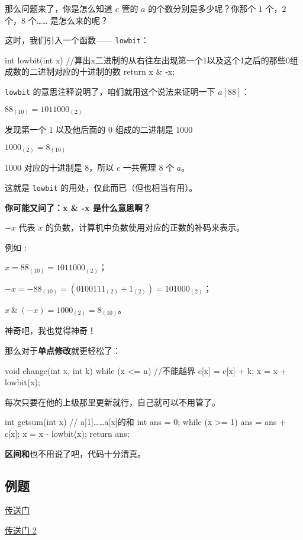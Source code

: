 那么问题来了，你是怎么知道 $c$ 管的 $a$ 的个数分别是多少呢？你那个 $1$ 个，$2$ 个，$8$ 个…… 是怎么来的呢？

这时，我们引入一个函数—— \texttt{lowbit}：

\begin{cppcode}
int lowbit(int x) {
  //算出x二进制的从右往左出现第一个1以及这个1之后的那些0组成数的二进制对应的十进制的数
  return x & -x;
}
\end{cppcode}

\texttt{lowbit} 的意思注释说明了，咱们就用这个说法来证明一下 $a[88]$：

$88_{(10)}=1011000_{(2)}$

发现第一个 $1$ 以及他后面的 $0$ 组成的二进制是 $1000$

$1000_{(2)} = 8_{(10)}$

$1000$ 对应的十进制是 $8$，所以 $c$ 一共管理 $8$ 个 $a$。

这就是 \texttt{lowbit} 的用处，仅此而已（但也相当有用）。

\textbf{你可能又问了：x \& -x 是什么意思啊？}

\begin{QUOTE}{}{}
$-x$ 代表 $x$ 的负数，计算机中负数使用对应的正数的补码来表示。
\end{QUOTE}

例如 :

$x =88_{(10)}=1011000_{(2)}$；

$-x = -88_{(10)} = (0100111_{(2)} + 1_{(2)}) =101000_{(2)}$；

$x\ \& \ (-x) = 1000_{(2)} = 8_{(10)}$。

神奇吧，我也觉得神奇！

那么对于\textbf{单点修改}就更轻松了：

\begin{cppcode}
void change(int x, int k) {
  while (x <= n)  //不能越界
  {
    c[x] = c[x] + k;
    x = x + lowbit(x);
  }
}
\end{cppcode}

每次只要在他的上级那里更新就行，自己就可以不用管了。

\begin{cppcode}
int getsum(int x)  // a[1]……a[x]的和
{
  int ans = 0;
  while (x >= 1) {
    ans = ans + c[x];
    x = x - lowbit(x);
  }
  return ans;
}
\end{cppcode}

\textbf{区间和}也不用说了吧，代码十分清真。

\subsection{例题}

\href{https://www.luogu.org/problemnew/show/P3374}{传送门}

\href{https://www.luogu.org/problemnew/show/P3368}{传送门 2}
